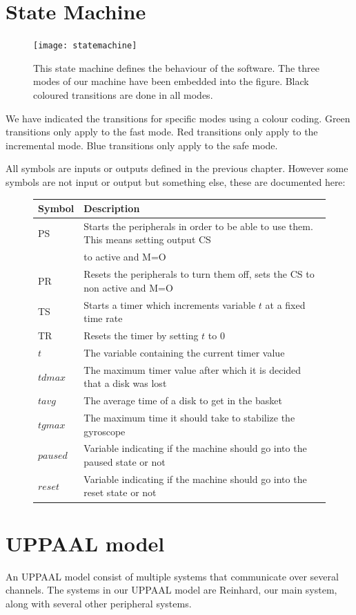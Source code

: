 \documentclass[a4paper,oneside,11pt]{article}
\begin{document}
\section{State Machine}
\begin{figure}[H]
	\centering
	\texttt{[image: statemachine]}
	\caption{This state machine defines the behaviour of the software. The three modes of our machine have been embedded into the figure. Black coloured transitions are done in all modes.}
\end{figure}
We have indicated the transitions for specific modes using a colour coding. Green transitions only apply to the fast mode. Red transitions only apply to the incremental mode. Blue transitions only apply to the safe mode. 

All symbols are inputs or outputs defined in the previous chapter. However some symbols are not input or output but something else, these are documented here:

\begin{figure}[H]
\begin{tabular}{|l|l|}
\hline
\textbf{Symbol} & \textbf{Description} \\
\hline
PS & Starts the peripherals in order to be able to use them. This means setting output CS \\
 &  to active and M=O \\
PR & Resets the peripherals to turn them off, sets the CS to non active and M=O \\
TS & Starts a timer which increments variable $t$ at a fixed time rate \\
TR & Resets the timer by setting $t$ to 0\\
$t$ & The variable containing the current timer value \\
$tdmax$ & The maximum timer value after which it is decided that a disk was lost \\
$tavg$ & The average time of a disk to get in the basket \\
$tgmax$ & The maximum time it should take to stabilize the gyroscope \\
$paused$ & Variable indicating if the machine should go into the paused state or not \\
$reset$ & Variable indicating if the machine should go into the reset state or not \\
\hline
\end{tabular}
\end{figure}

\section{UPPAAL model}
An UPPAAL model consist of multiple systems that communicate over several channels. The systems in our UPPAAL model are Reinhard, our main system, along with several other peripheral systems.
\end{document}
